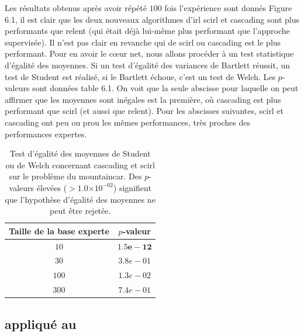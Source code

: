 \documentclass[frenchb,a4paper,justified,notoc]{tufte-book}
\providecommand{\e}[1]{\ensuremath{\times 10^{#1}}}
\begin{document}
Les résultats obtenus après avoir répété $100$ fois l'expérience sont donnés Figure 6.1,
il est clair que les deux nouveaux algorithmes d'\gls{irl} \gls{scirl} et \gls{cascading} sont plus performants que \gls{relent} (qui était déjà lui-même plus performant que l'approche supervisée). Il n'est pas clair en revanche qui de \gls{scirl} ou \gls{cascading} est le plus performant. Pour en avoir le cœur net, nous allons procéder à un test statistique d'égalité des moyennes. Si un test d'égalité des variances de Bartlett réussit, un test de Student est réalisé, si le Bartlett échoue, c'est un test de Welch. Les $p$-valeurs sont données table 6.1. On voit que la seule abscisse pour laquelle on peut affirmer que les moyennes sont inégales est la première, où \gls{cascading} est plus performant que \gls{scirl} (et aussi que \gls{relent}). Pour les abscisses suivantes, \gls{scirl} et \gls{cascading} ont peu ou prou les mêmes performances, très proches des performances expertes.

\begin{table}
\centering
\begin{tabular}{cc}
\toprule
Taille de la base experte & $p$-valeur\\
\midrule
$ 10$ & $\mathbf{1.5e-12}$\\
$ 30$ & $3.8e-01$\\
$100$ & $1.3e-02$\\
$300$ & $7.4e-01$\\
\bottomrule
\end{tabular}
\caption[Départager  et  sur le ]{Test d'égalité des moyennes de Student ou de Welch concernant \gls{cascading} et \gls{scirl} sur le problème du \gls{mountaincar}. Des $p$-valeurs élevées ($>1.0\e{-02}$) signifient que l'hypothèse d'égalité des moyennes ne peut être rejetée.}
\label{tab:mountaincar}
\end{table}
\subsection{ appliqué au }
\label{sec-6-3-3}
\end{document}

